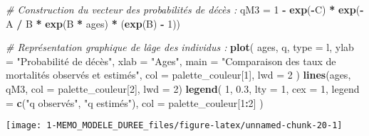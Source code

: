 \documentclass[
]{article}
\newenvironment{Shaded}{\begin{snugshade}}{\end{snugshade}}
\newcommand{\AttributeTok}[1]{\textcolor[rgb]{0.13,0.29,0.53}{#1}}
\newcommand{\CommentTok}[1]{\textcolor[rgb]{0.56,0.35,0.01}{\textit{#1}}}
\newcommand{\DecValTok}[1]{\textcolor[rgb]{0.00,0.00,0.81}{#1}}
\newcommand{\FloatTok}[1]{\textcolor[rgb]{0.00,0.00,0.81}{#1}}
\newcommand{\FunctionTok}[1]{\textcolor[rgb]{0.13,0.29,0.53}{\textbf{#1}}}
\newcommand{\NormalTok}[1]{#1}
\newcommand{\OtherTok}[1]{\textcolor[rgb]{0.56,0.35,0.01}{#1}}
\newcommand{\SpecialCharTok}[1]{\textcolor[rgb]{0.81,0.36,0.00}{\textbf{#1}}}
\newcommand{\StringTok}[1]{\textcolor[rgb]{0.31,0.60,0.02}{#1}}
\begin{document}
\begin{Shaded}
\begin{Highlighting}[]
\CommentTok{\# Construction du vecteur des probabilités de décès : }
\NormalTok{qM3 }\OtherTok{=} \DecValTok{1} \SpecialCharTok{{-}} \FunctionTok{exp}\NormalTok{(}\SpecialCharTok{{-}}\NormalTok{C) }\SpecialCharTok{*} \FunctionTok{exp}\NormalTok{(}\SpecialCharTok{{-}}\NormalTok{A }\SpecialCharTok{/}\NormalTok{ B }\SpecialCharTok{*} \FunctionTok{exp}\NormalTok{(B }\SpecialCharTok{*}\NormalTok{ ages) }\SpecialCharTok{*}\NormalTok{ (}\FunctionTok{exp}\NormalTok{(B) }\SpecialCharTok{{-}} \DecValTok{1}\NormalTok{))}

\CommentTok{\# Représentation graphique de l\textquotesingle{}âge des individus : }
\FunctionTok{plot}\NormalTok{(}
\NormalTok{  ages,}
\NormalTok{  q,}
  \AttributeTok{type =} \StringTok{\textquotesingle{}l\textquotesingle{}}\NormalTok{,}
  \AttributeTok{ylab =} \StringTok{"Probabilité de décès"}\NormalTok{,}
  \AttributeTok{xlab =} \StringTok{"Ages"}\NormalTok{,}
  \AttributeTok{main =} \StringTok{"Comparaison des taux de mortalités observés et estimés"}\NormalTok{,}
  \AttributeTok{col =}\NormalTok{ palette\_couleur[}\DecValTok{1}\NormalTok{],}
  \AttributeTok{lwd =} \DecValTok{2}
\NormalTok{)}
\FunctionTok{lines}\NormalTok{(ages, qM3, }\AttributeTok{col =}\NormalTok{ palette\_couleur[}\DecValTok{2}\NormalTok{], }\AttributeTok{lwd =} \DecValTok{2}\NormalTok{)}
\FunctionTok{legend}\NormalTok{(}
  \DecValTok{1}\NormalTok{,}
  \FloatTok{0.3}\NormalTok{,}
  \AttributeTok{lty =} \DecValTok{1}\NormalTok{,}
  \AttributeTok{cex =} \DecValTok{1}\NormalTok{,}
  \AttributeTok{legend =} \FunctionTok{c}\NormalTok{(}\StringTok{"q observés"}\NormalTok{, }\StringTok{"q estimés"}\NormalTok{),}
  \AttributeTok{col =}\NormalTok{ palette\_couleur[}\DecValTok{1}\SpecialCharTok{:}\DecValTok{2}\NormalTok{]}
\NormalTok{)}
\end{Highlighting}
\end{Shaded}

\begin{center}\texttt{[image: 1-MEMO\_MODELE\_DUREE\_files/figure-latex/unnamed-chunk-20-1]} \end{center}
\end{document}
